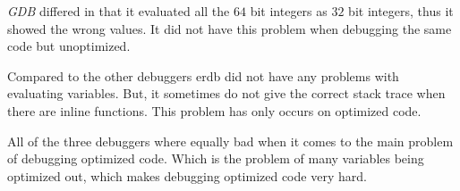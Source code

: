 \emph{GDB} differed in that it evaluated all the $64$ bit integers as $32$ bit integers, thus it showed the wrong values.
It did not have this problem when debugging the same code but unoptimized.


Compared to the other debuggers \gls{erdb} did not have any problems with evaluating variables.
But, it sometimes do not give the correct stack trace when there are inline functions.
This problem has only occurs on optimized code.


All of the three debuggers where equally bad when it comes to the main problem of debugging optimized code.
Which is the problem of many variables being optimized out, which makes debugging optimized code very hard.

